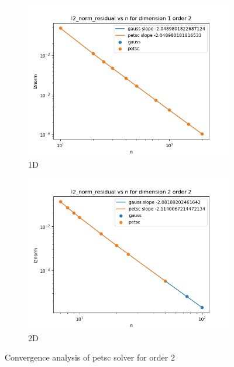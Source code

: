 \documentclass[12 pt, final]{article}
\begin{document}
\begin{itemize}
       \begin{figure}[H]
        \centering
        \begin{subfigure}{.5\textwidth}
          \centering
          \includegraphics[width=.99\linewidth]{figures/l2norm_petsc_gauss_order_2_dimension_1.png}
          \caption{1D}
          \label{fig:sub1}
        \end{subfigure}%
        \begin{subfigure}{.5\textwidth}
          \centering
          \includegraphics[width=.99\linewidth]{figures/l2norm_petsc_gauss_order_2_dimension_2.png}
          \caption{2D}
          \label{fig:sub2}
        \end{subfigure}
        \caption{Convergence analysis of petsc solver for order 2}

\end{figure}
\end{itemize}
\end{document}
